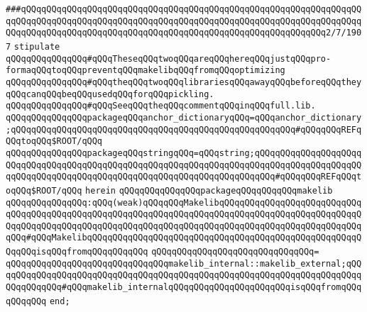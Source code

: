 \verb|###qQQqqQQqqQQqqQQqqQQqqQQqqQQqqQQqqQQqqQQqqQQqqQQqqQQqqQQqqQQqqQQqqQQqqQQqqQQqqQQqqQQqqQQqqQQqqQQqqQQqqQQqqQQqqQQqqQQqqQQqqQQqqQQqqQQqqQQqqQQqqQQqqQQqqQQqqQQqqQQqqQQqqQQqqQQqqQQqqQQqqQQqqQQqqQQqqQQqqQQq2/7/1907|\newline
\newline
\newline
\newline
\verb|stipulate|\newline
\newline
\verb|qQQqqQQqqQQqqQQq#qQQqTheseqQQqtwoqQQqareqQQqhereqQQqjustqQQqpro-formaqQQqtoqQQqpreventqQQqmakelibqQQqfromqQQqoptimizing|\newline
\verb|qQQqqQQqqQQqqQQq#qQQqtheqQQqtwoqQQqlibrariesqQQqawayqQQqbeforeqQQqtheyqQQqcanqQQqbeqQQqusedqQQqforqQQqpickling.|\newline
\verb|qQQqqQQqqQQqqQQq#qQQqSeeqQQqtheqQQqcommentqQQqinqQQqfull.lib.|\newline
\newline
\verb|qQQqqQQqqQQqqQQqpackageqQQqanchor_dictionaryqQQq=qQQqanchor_dictionary;qQQqqQQqqQQqqQQqqQQqqQQqqQQqqQQqqQQqqQQqqQQqqQQqqQQqqQQq#qQQqqQQqREFqQQqtoqQQq$ROOT/|\verb|qQQq|\newline
\verb|qQQqqQQqqQQqqQQqpackageqQQqstringqQQq=qQQqstring;qQQqqQQqqQQqqQQqqQQqqQQqqQQqqQQqqQQqqQQqqQQqqQQqqQQqqQQqqQQqqQQqqQQqqQQqqQQqqQQqqQQqqQQqqQQqqQQqqQQqqQQqqQQqqQQqqQQqqQQqqQQqqQQqqQQqqQQqqQQqqQQq#qQQqqQQqREFqQQqtoqQQq$ROOT/|\verb|qQQq|\newline
\verb|herein|\newline
\verb|qQQqqQQqqQQqqQQqpackageqQQqqQQqqQQqmakelib|\newline
\verb|qQQqqQQqqQQqqQQq:qQQq(weak)qQQqqQQqMakelibqQQqqQQqqQQqqQQqqQQqqQQqqQQqqQQqqQQqqQQqqQQqqQQqqQQqqQQqqQQqqQQqqQQqqQQqqQQqqQQqqQQqqQQqqQQqqQQqqQQqqQQqqQQqqQQqqQQqqQQqqQQqqQQqqQQqqQQqqQQqqQQqqQQqqQQqqQQqqQQqqQQqqQQqqQQq#qQQqMakelibqQQqqQQqqQQqqQQqqQQqqQQqqQQqqQQqqQQqqQQqqQQqqQQqqQQqqQQqqQQqisqQQqfromqQQqqQQqqQQq|\newline
\verb|qQQqqQQqqQQqqQQqqQQqqQQqqQQqqQQq=|\newline
\verb|qQQqqQQqqQQqqQQqqQQqqQQqqQQqqQQqmakelib_internal::makelib_external;qQQqqQQqqQQqqQQqqQQqqQQqqQQqqQQqqQQqqQQqqQQqqQQqqQQqqQQqqQQqqQQqqQQqqQQqqQQqqQQqqQQq#qQQqmakelib_internalqQQqqQQqqQQqqQQqqQQqqQQqisqQQqfromqQQqqQQqqQQq|\newline
\verb|end;|\newline
\newline

